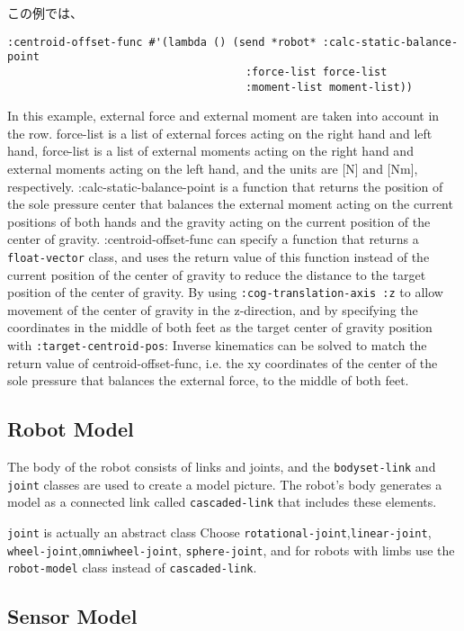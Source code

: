 この例では、
{\baselineskip=10pt
\begin{verbatim}
:centroid-offset-func #'(lambda () (send *robot* :calc-static-balance-point
                                     :force-list force-list
                                     :moment-list moment-list))
\end{verbatim}
}
In this example, external force and external moment are taken into account in the row. force-list is a list of external forces acting on the right hand and left hand, force-list is a list of external moments acting on the right hand and external moments acting on the left hand, and the units are [N] and [Nm], respectively. :calc-static-balance-point is a function that returns the position of the sole pressure center that balances the external moment acting on the current positions of both hands and the gravity acting on the current position of the center of gravity. :centroid-offset-func can specify a function that returns a \verb|float-vector| class, and uses the return value of this function instead of the current position of the center of gravity to reduce the distance to the target position of the center of gravity. By using \verb|:cog-translation-axis :z| to allow movement of the center of gravity in the z-direction, and by specifying the coordinates in the middle of both feet as the target center of gravity position with \verb|:target-centroid-pos|: Inverse kinematics can be solved to match the return value of centroid-offset-func, i.e. the xy coordinates of the center of the sole pressure that balances the external force, to the middle of both feet.

 \subsection{Robot Model}

 The body of the robot consists of links and joints, and the \verb|bodyset-link| and \verb|joint| classes are used to create a model picture. The robot's body generates a model as a connected link called \verb|cascaded-link| that includes these elements.

 \verb|joint| is actually an abstract class
 Choose \verb|rotational-joint|,\verb|linear-joint|,
 \verb|wheel-joint|,\verb|omniwheel-joint|,
 \verb|sphere-joint|, and for robots with limbs use the \verb|robot-model| class instead of \verb|cascaded-link|.

  
  
  
 \subsection{Sensor Model}
  
